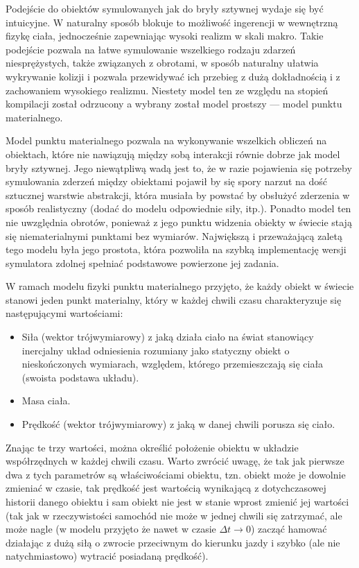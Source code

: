\par{
Podejście do obiektów symulowanych jak do bryły sztywnej wydaje się być intuicyjne. W naturalny sposób blokuje to możliwość ingerencji w wewnętrzną fizykę ciała, jednocześnie zapewniając wysoki realizm w skali makro.
Takie podejście pozwala na łatwe symulowanie wszelkiego rodzaju zdarzeń niesprężystych, także związanych z obrotami, w sposób naturalny ułatwia wykrywanie kolizji i pozwala przewidywać ich przebieg z dużą dokładnością i z zachowaniem wysokiego realizmu.
Niestety model ten ze względu na stopień kompilacji został odrzucony a wybrany został model prostszy --- model punktu materialnego.
\par{
Model punktu materialnego pozwala na wykonywanie wszelkich obliczeń na obiektach, które nie nawiązują między sobą interakcji równie dobrze jak model bryły sztywnej. Jego niewątpliwą wadą jest to, że w razie pojawienia się potrzeby symulowania zderzeń między obiektami pojawił by się spory narzut na dość sztucznej warstwie abstrakcji, która musiała by powstać by obsłużyć zderzenia w sposób realistyczny (dodać do modelu odpowiednie siły, itp.).
Ponadto model ten nie uwzględnia obrotów, ponieważ z jego punktu widzenia obiekty w świecie stają się niematerialnymi punktami bez wymiarów.
Największą i przeważającą zaletą tego modelu była jego prostota, która pozwoliła na szybką implementację wersji symulatora zdolnej spełniać podstawowe powierzone jej zadania. 
}
\par{
W ramach modelu fizyki punktu materialnego przyjęto, że każdy obiekt w świecie stanowi jeden punkt materialny, który w każdej chwili czasu charakteryzuje się następującymi wartościami:
\begin{itemize}\renewcommand{\labelitemi}{$\bullet$}
\item Siła (wektor trójwymiarowy) z jaką działa ciało na świat stanowiący inercjalny układ odniesienia rozumiany jako statyczny obiekt o nieskończonych wymiarach, względem, którego przemieszczają się ciała (swoista podstawa układu).
\item Masa ciała.
\item Prędkość (wektor trójwymiarowy) z jaką w danej chwili porusza się ciało.
\end{itemize}
Znając te trzy wartości, można określić położenie obiektu w układzie współrzędnych w każdej chwili czasu.
Warto zwrócić uwagę, że tak jak pierwsze dwa z tych parametrów są właściwościami obiektu, tzn. obiekt może je dowolnie zmieniać w czasie, tak prędkość jest wartością wynikającą z dotychczasowej historii danego obiektu i sam obiekt nie jest w stanie wprost zmienić jej wartości (tak jak w rzeczywistości samochód nie może w jednej chwili się zatrzymać, ale może nagle (w modelu przyjęto że nawet w czasie $\Delta t \longrightarrow 0$) zacząć hamować działając z dużą siłą o zwrocie przeciwnym do kierunku jazdy i szybko (ale nie natychmiastowo) wytracić posiadaną prędkość).
}

}
